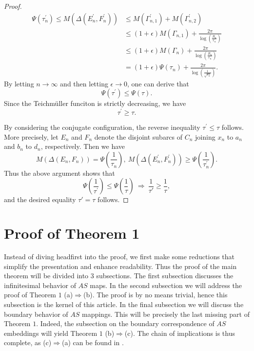 \documentclass[11pt]{amsart}
\numberwithin{equation}{section}
\theoremstyle{plain}
\theoremstyle{step}
\def\leq{\leqslant}
\def\geq{\geqslant}
\def\Ra{\Rightarrow}
\newcommand{\DeltaEFn}{\Delta(E_n,F_n)}
\newcommand{\DeltaEFnprime}{\Delta(E_n^\prime,F_n^\prime)}
\begin{document}
\begin{proof}
\begin{align*}
        \Psi(\tau_n^{\prime})\leq M(\DeltaEFnprime)&\leq M(\Gamma_{n,1}^\prime)+M(\Gamma_{n,2}^\prime)\\
        &\leq(1+\epsilon)M(\Gamma_{n,1})+\frac{2\pi}{\log\left(\tfrac{R_n}{r_n}\right)}\\
        &\leq(1+\epsilon)M(\Gamma_{n})+\frac{2\pi}{\log\left(\tfrac{R_n}{r_n}\right)}\\
        &= (1+\epsilon)\Psi(\tau_n)+\frac{2\pi}{\log\left(\tfrac{1}{\sqrt{r_n}}\right)}.
    \end{align*}
    By letting $n\rightarrow\infty$ and then letting $\epsilon\rightarrow 0$, one can derive that 
    \[
    \Psi(\tau^\prime)\leq \Psi(\tau).
    \]
    Since the Teichm\"uller funciton is strictly decreasing, we have 
    \[
    \tau^\prime\geq\tau.
    \]
    
    By considering the conjugate configuration, the reverse inequality
    $\tau^\prime\leq \tau$ follows. More precisely, let $E_n$ and $F_n$ denote the disjoint subarcs of $C_n$ joining $x_n$ to $ a_n$ and $b_n$ to $d_n$, respectively. Then we have 
    \[
     M(\DeltaEFn)=\Psi(\frac{1}{\tau_n}), \ M(\DeltaEFnprime)\geq \Psi(\frac{1}{\tau_n^\prime}).
    \]
    Thus the above argument shows that
    \[
    \Psi(\frac{1}{\tau^\prime})\leq \Psi(\frac{1}{\tau}) \ \Rightarrow \ \frac{1}{\tau'}\geq\frac{1}{\tau},
    \]
    and the desired equality $\tau'=\tau$ follows.
\end{proof}

\section{Proof of Theorem 1}\label{Section:3}
Instead of diving headfirst into the proof, we first make some reductions that simplify the presentation and enhance readability. Thus the proof of the main theorem will be divided into $3$ subsections. The first subsection discusses the infinitesimal behavior of $AS$ maps. In the second subsection we will address the proof of Theorem $1$ (a)$\Ra$(b). The proof is by no means trivial, hence this subsection is the kernel of this article. In the final subsection we will discuss the boundary behavior of $AS$ mappings. This will be precisely the last missing part of Theorem $1$. Indeed, the subsection on the boundary correspondence of $AS$ embeddings will yield Theorem $1$ (b)$\Ra$(c). The chain of implications is thus complete, as (c)$\Ra$(a) can be found in \cite[Theorem 3.2]{brania2004asymptotically}.
\end{document}
